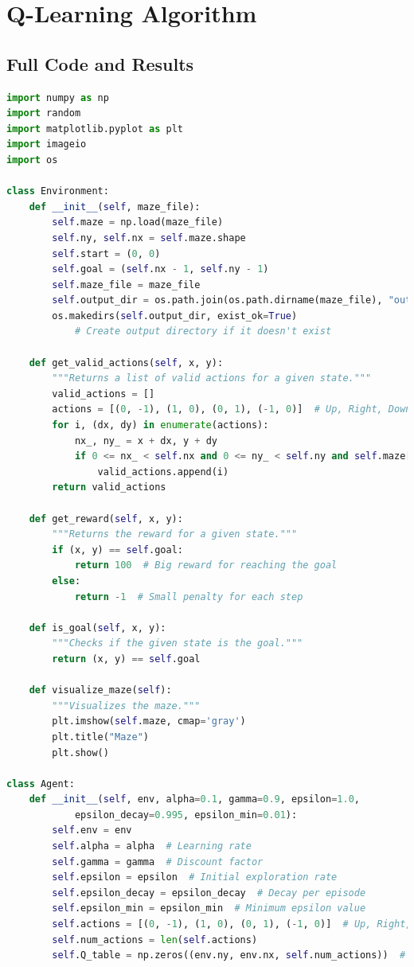 \documentclass[11pt]{article}
\begin{document}
\section{Q-Learning Algorithm}
\subsection{Full Code and Results}
\begin{lstlisting}[language=Python]
import numpy as np
import random
import matplotlib.pyplot as plt
import imageio
import os

class Environment:
    def __init__(self, maze_file):
        self.maze = np.load(maze_file)
        self.ny, self.nx = self.maze.shape
        self.start = (0, 0)
        self.goal = (self.nx - 1, self.ny - 1)
        self.maze_file = maze_file
        self.output_dir = os.path.join(os.path.dirname(maze_file), "output")
        os.makedirs(self.output_dir, exist_ok=True)  
            # Create output directory if it doesn't exist

    def get_valid_actions(self, x, y):
        """Returns a list of valid actions for a given state."""
        valid_actions = []
        actions = [(0, -1), (1, 0), (0, 1), (-1, 0)]  # Up, Right, Down, Left
        for i, (dx, dy) in enumerate(actions):
            nx_, ny_ = x + dx, y + dy
            if 0 <= nx_ < self.nx and 0 <= ny_ < self.ny and self.maze[ny_][nx_] == 0:
                valid_actions.append(i)
        return valid_actions

    def get_reward(self, x, y):
        """Returns the reward for a given state."""
        if (x, y) == self.goal:
            return 100  # Big reward for reaching the goal
        else:
            return -1  # Small penalty for each step

    def is_goal(self, x, y):
        """Checks if the given state is the goal."""
        return (x, y) == self.goal

    def visualize_maze(self):
        """Visualizes the maze."""
        plt.imshow(self.maze, cmap='gray')
        plt.title("Maze")
        plt.show()

class Agent:
    def __init__(self, env, alpha=0.1, gamma=0.9, epsilon=1.0, 
            epsilon_decay=0.995, epsilon_min=0.01):
        self.env = env
        self.alpha = alpha  # Learning rate
        self.gamma = gamma  # Discount factor
        self.epsilon = epsilon  # Initial exploration rate
        self.epsilon_decay = epsilon_decay  # Decay per episode
        self.epsilon_min = epsilon_min  # Minimum epsilon value
        self.actions = [(0, -1), (1, 0), (0, 1), (-1, 0)]  # Up, Right, Down, Left
        self.num_actions = len(self.actions)
        self.Q_table = np.zeros((env.ny, env.nx, self.num_actions))  # Q-table


\end{lstlisting}
\end{document}
